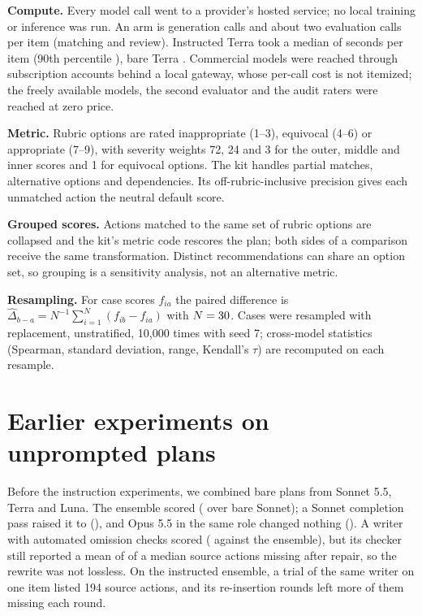 \documentclass[11pt]{article}
\begin{document}
\textbf{Compute.} Every model call went to a provider's hosted service; no local training or
inference was run. An arm is \nItems{} generation calls and about two evaluation calls per item
(matching and review). Instructed Terra took a median of \covRuntimeTerraSpec{} seconds per item
(90th percentile \covRuntimePninetyTerraSpec{}), bare Terra \covRuntimeTerraBare{}. Commercial
models were reached through subscription accounts behind a local gateway, whose per-call cost is not
itemized; the freely available models, the second evaluator and the audit raters were reached at
zero price.

\textbf{Metric.} Rubric options are rated inappropriate (1--3), equivocal (4--6) or appropriate
(7--9), with severity weights 72, 24 and 3 for the outer, middle and inner scores and 1 for
equivocal options. The kit handles partial matches, alternative options and dependencies. Its
off-rubric-inclusive precision gives each unmatched action the neutral default score.

\textbf{Grouped scores.} Actions matched to the same set of rubric options are collapsed and the
kit's metric code rescores the plan; both sides of a comparison receive the same transformation.
Distinct recommendations can share an option set, so grouping is a sensitivity analysis, not an
alternative metric.

\textbf{Resampling.} For case scores $f_{ia}$ the paired difference is
$\widehat{\Delta}_{b-a} = N^{-1}\sum_{i=1}^{N}(f_{ib}-f_{ia})$ with $N=30$. Cases were
resampled with replacement, unstratified, 10,000 times with seed 7; cross-model statistics
(Spearman, standard deviation, range, Kendall's $\tau$) are recomputed on each resample.

\section{Earlier experiments on unprompted plans}
\label{app:earlier}
Before the instruction experiments, we combined bare plans from Sonnet 5.5, Terra and Luna. The
ensemble scored \covFUnionBare{} (\covDUnionBareVsSonnet{} over bare Sonnet); a Sonnet completion
pass raised it to \covFGap{} (\covDGapVsUnion{}), and Opus 5.5 in the same role changed nothing
(\covDOpusVsSonnetGap{}). A writer with automated omission checks scored \covFWriterBare{}
(\covDWriterVsUnion{} against the ensemble), but its checker still reported a mean of
\covMissingFinalMean{} of a median \covSourceActionsMedian{} source actions missing after repair,
so the rewrite was not lossless. On the instructed ensemble, a trial of the same writer on one
item listed 194 source actions, and its re-insertion rounds left more of them missing each round.
\end{document}
